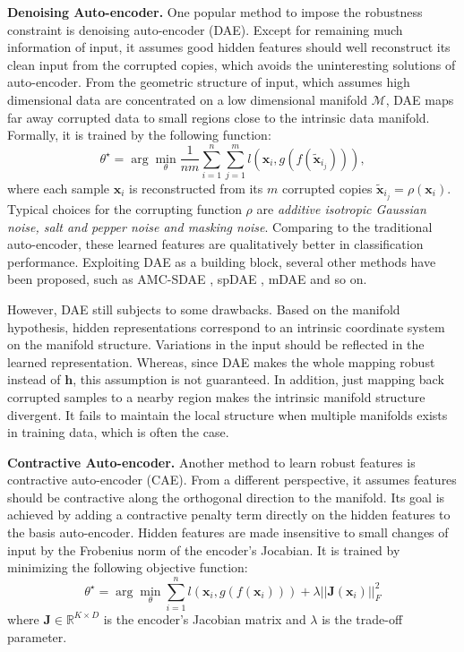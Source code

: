 \documentclass{article}
\def \x{\mathbf x}
\def \h{\mathbf h}
\def \J{\mathbf J}
\def \MM{{\mathcal M}}
\def \tx{\tilde{\mathbf x}}
\begin{document}
\textbf{Denoising Auto-encoder.} One popular method to impose the robustness constraint is denoising auto-encoder (DAE). Except for remaining much information of input, it assumes good hidden features should well reconstruct its clean input from the corrupted copies, which avoids the uninteresting solutions of auto-encoder. From the geometric structure of input, which assumes high dimensional data are concentrated on a low dimensional manifold $\MM$, DAE maps far away corrupted data to small regions close to the intrinsic data manifold. Formally, it is trained by the following function:
\begin{equation}
     \theta^{\star} = \arg\min_{\theta} \frac{1}{nm}\sum_{i = 1}^n \sum_{j = 1}^m l(\x_i, g(f(\tx_{i_j}))),
     \label{eq:obj_dae}
\end{equation}
where each sample $\x_i$ is reconstructed from its $m$ corrupted copies $\tx_{i_j} = \rho(\x_i)$. Typical choices for the corrupting function $\rho$ are \emph{additive isotropic Gaussian noise, salt and pepper noise and masking noise}.  Comparing to the traditional auto-encoder, these learned features are qualitatively better in classification performance. Exploiting DAE as a building block, several other methods have been proposed, such as AMC-SDAE \cite{agostinelli2013adaptive}, spDAE \cite{cho2013simple}, mDAE \cite{chen2014marginalized} and so on.

However, DAE still subjects to some drawbacks. Based on the manifold hypothesis, hidden representations correspond to an intrinsic coordinate system on the manifold structure. Variations in the input should be reflected in the learned representation. Whereas, since DAE makes the whole mapping robust instead of $\h$, this assumption is not guaranteed. In addition, just mapping back corrupted samples to a nearby region makes the intrinsic manifold structure divergent. It fails to maintain the local structure when multiple manifolds exists in training data, which is often the case.

\textbf{Contractive Auto-encoder.} Another method to learn robust features is contractive auto-encoder (CAE). From a different perspective, it assumes features should be contractive along the orthogonal direction to the manifold. Its goal is achieved by adding a contractive penalty term directly on the hidden features to the basis auto-encoder. Hidden features are made insensitive to small changes of input by the Frobenius norm of the encoder's Jocabian. It is trained by minimizing the following objective function:
\begin{equation}
    \theta^{\star} = \arg\min_{\theta} \sum_{i=1}^n  l(\x_i, g(f(\x_i))) + \lambda ||\J(\x_i)||^2_F
  \label{eq:obj_cae}
\end{equation}
where $\J \in \mathbb{R}^{K \times D}$ is the encoder's Jacobian matrix and $\lambda$ is the trade-off parameter.
\end{document}
